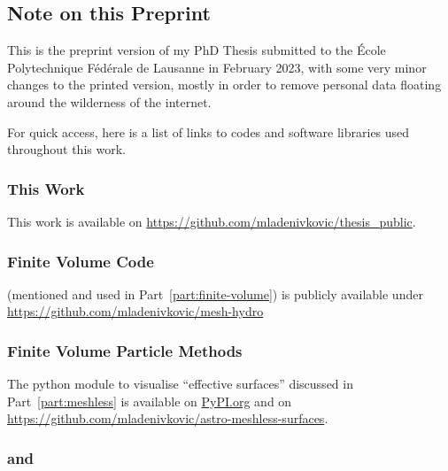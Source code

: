 \cleardoublepage

\begin{small}

\chapter*{Note on this Preprint}

This is the preprint version of my PhD Thesis submitted to the \'Ecole Polytechnique F\'ed\'erale 
de Lausanne in February 2023, with some very minor changes to the printed version, mostly in order 
to remove personal data floating around the wilderness of the internet.

For quick access, here is a list of links to codes and software libraries used throughout this work.


\subsection*{This Work}

This work is available on \url{https://github.com/mladenivkovic/thesis_public}.


\subsection*{Finite Volume Code}

\meshhydro (mentioned and used in Part~\ref{part:finite-volume}) is publicly available under
\url{https://github.com/mladenivkovic/mesh-hydro}



\subsection*{Finite Volume Particle Methods}

The python module to visualise ``effective surfaces'' discussed in Part~\ref{part:meshless} is 
available on \href{https://github.com/mladenivkovic/astro-meshless-surfaces}{PyPI.org} and on 
\url{https://github.com/mladenivkovic/astro-meshless-surfaces}.


\subsection*{\GEARRT and \swift}


\end{small}
